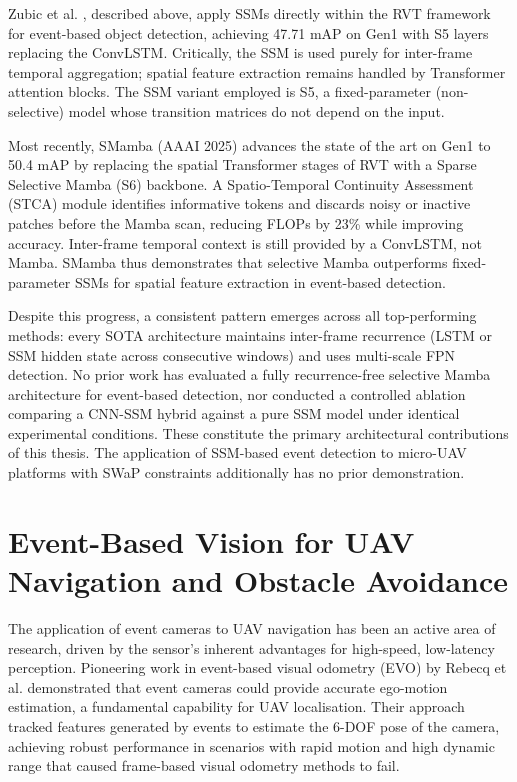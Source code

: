\documentclass[11pt, a4paper]{report}
\begin{document}
Zubic et al. \cite{zubic2024state}, described above, apply SSMs directly within the RVT framework for event-based object detection, achieving 47.71 mAP on Gen1 with S5 layers replacing the ConvLSTM. Critically, the SSM is used purely for inter-frame temporal aggregation; spatial feature extraction remains handled by Transformer attention blocks. The SSM variant employed is S5, a fixed-parameter (non-selective) model whose transition matrices do not depend on the input. 

Most recently, SMamba \cite{yang2025smamba} (AAAI 2025) advances the state of the art on Gen1 to 50.4 mAP by replacing the spatial Transformer stages of RVT with a Sparse Selective Mamba (S6) backbone. A Spatio-Temporal Continuity Assessment (STCA) module identifies informative tokens and discards noisy or inactive patches before the Mamba scan, reducing FLOPs by 23\% while improving accuracy. Inter-frame temporal context is still provided by a ConvLSTM, not Mamba. SMamba thus demonstrates that selective Mamba outperforms fixed-parameter SSMs for spatial feature extraction in event-based detection. 

Despite this progress, a consistent pattern emerges across all top-performing methods: every SOTA architecture maintains inter-frame recurrence (LSTM or SSM hidden state across consecutive windows) and uses multi-scale FPN detection. No prior work has evaluated a fully recurrence-free selective Mamba architecture for event-based detection, nor conducted a controlled ablation comparing a CNN-SSM hybrid against a pure SSM model under identical experimental conditions. These constitute the primary architectural contributions of this thesis. The application of SSM-based event detection to micro-UAV platforms with SWaP constraints additionally has no prior demonstration.

\section{Event-Based Vision for UAV Navigation and Obstacle Avoidance}
The application of event cameras to UAV navigation has been an active area of research, driven by the sensor's inherent advantages for high-speed, low-latency perception. Pioneering work in event-based visual odometry (EVO) by Rebecq et al. \cite{rebecq2017real} demonstrated that event cameras could provide accurate ego-motion estimation, a fundamental capability for UAV localisation. Their approach tracked features generated by events to estimate the 6-DOF pose of the camera, achieving robust performance in scenarios with rapid motion and high dynamic range that caused frame-based visual odometry methods to fail. 
\end{document}
